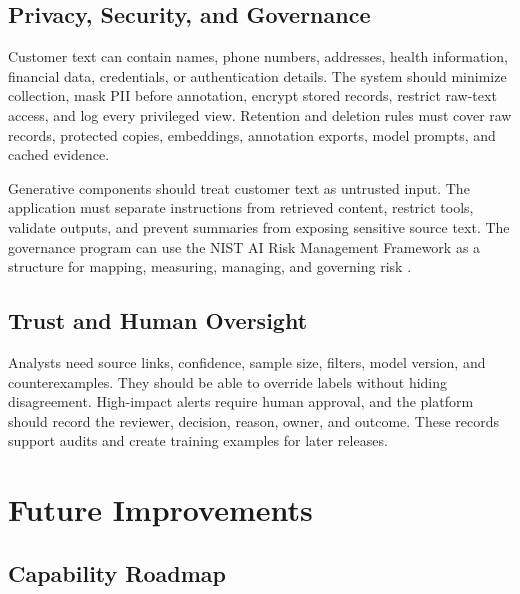 \documentclass[11pt,a4paper,twoside]{article}
\begin{document}
\subsection{Privacy, Security, and Governance}

Customer text can contain names, phone numbers, addresses, health information, financial data, credentials, or authentication details. The system should minimize collection, mask PII before annotation, encrypt stored records, restrict raw-text access, and log every privileged view. Retention and deletion rules must cover raw records, protected copies, embeddings, annotation exports, model prompts, and cached evidence.

Generative components should treat customer text as untrusted input. The application must separate instructions from retrieved content, restrict tools, validate outputs, and prevent summaries from exposing sensitive source text. The governance program can use the NIST AI Risk Management Framework as a structure for mapping, measuring, managing, and governing risk \cite{nist2023}.

\subsection{Trust and Human Oversight}

Analysts need source links, confidence, sample size, filters, model version, and counterexamples. They should be able to override labels without hiding disagreement. High-impact alerts require human approval, and the platform should record the reviewer, decision, reason, owner, and outcome. These records support audits and create training examples for later releases.

\newpage

\section{Future Improvements}

\subsection{Capability Roadmap}
\end{document}
